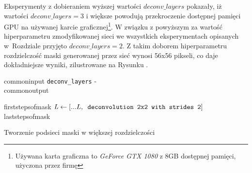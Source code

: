Eksperymenty z dobieraniem wyższej wartości $deconv\_layers$ pokazały, iż wartości $deconv\_layers = 3$ i większe powodują przekroczenie dostępnej pamięci GPU na używanej karcie graficznej\footnote{Używana karta graficzna to \textit{GeForce GTX 1080} z 8GB dostępnej pamięci, użyczona przez firmę \blue{}}.
W związku z powyższym za wartość hiperparametru zmodyfikowanej sieci we wszystkich eksperymentach opisanych w~Rozdziale  przyjęto $deconv\_layers = 2$. Z takim doborem hiperparametru rozdzielczość maski generowanej przez sieć wynosi 56x56 pikseli, co daje dokładniejsze wyniki, zilustrowane na Rysunku .

\vspace{0.5cm}

\begin{algorithm}
  {commoninput}
  \hspace*{\algorithmicindent} \verb|deconv_layers| - \deconvlayersdescription \\
  {commonoutput}
  \begin{algorithmic}[1]
    {firststepsofmask}
      \State $\mathit{L} \gets [...L,\verb| deconvolution 2x2 with strides 2|]$
    \EndFor
    {laststepsofmask}
	\end{algorithmic}
	\caption{Tworzenie podsieci maski w większej rozdzielczości}
	\label{alg:mask-r-cnn-modified}
\end{algorithm}
